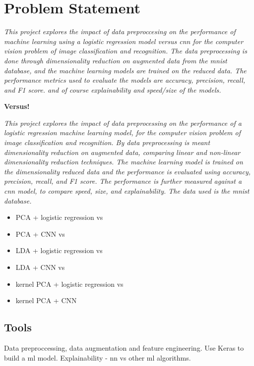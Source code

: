 \section{Problem Statement}\label{sec:problem-statement}
\emph{This project explores the impact of data preproccesing on the performance of machine learning using a logistic regression model versus \gls{cnn} for the computer vision problem of image classification and recognition. The data preprocessing is done through dimensionality reduction on augmented data from the \gls{mnist} database, and the machine learning models are trained on the reduced data. The performance metrics used to evaluate the models are accuracy, precision, recall, and F1 score. and of course explainability and speed/size of the models.}

\vspace{2mm}
\textbf{Versus!}
\vspace{2mm}

\noindent
\emph{This project explores the impact of data preprocessing on the performance of a logistic regression machine learning model, for the computer vision problem of image classification and recognition. By data preprocessing is meant dimensionality reduction on augmented data, comparing linear and non-linear dimensionality reduction techniques. The machine learning model is trained on the dimensionality reduced data and the performance is evaluated using accuracy, precision, recall, and F1 score. The performance is further measured against a \gls{cnn} model, to compare speed, size, and explainability. The data used is the \gls{mnist} database.}


\begin{itemize}
    \setlength\itemsep{0em}
    \item PCA + logistic regression vs
    \item PCA + CNN vs
    \item LDA + logistic regression vs
    \item LDA + CNN vs
    \item kernel PCA + logistic regression vs
    \item kernel PCA + CNN
\end{itemize}


\subsection{Tools}\label{subsec:tools}
Data preproccessing, data augmentation and feature engineering. Use Keras to build a \gls{ml} model. Explainability - \gls{nn} vs other \gls{ml} algorithms.

